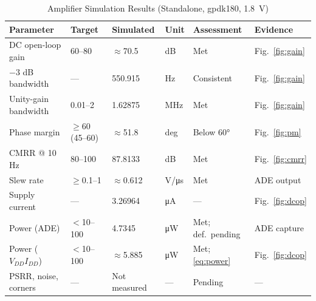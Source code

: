 \documentclass[conference]{IEEEtran}
\begin{document}
\begin{table}[!t]
\caption{Amplifier Simulation Results (Standalone, gpdk180, \SI{1.8}{\volt})}
\label{tab:res}
\centering\footnotesize
\begin{tabular}{@{}llllll@{}}
\toprule
Parameter & Target & Simulated & Unit & Assessment & Evidence \\
\midrule
DC open-loop gain & 60--80 & $\approx$70.5 & dB & Met & Fig.~\ref{fig:gain} \\
$-3$ dB bandwidth & --- & 550.915 & Hz & Consistent & Fig.~\ref{fig:gain} \\
Unity-gain bandwidth & 0.01--2 & 1.62875 & MHz & Met & Fig.~\ref{fig:gain} \\
Phase margin & $\ge$60 (45--60) & $\approx$51.8 & deg & Below \ang{60} & Fig.~\ref{fig:pm} \\
CMRR @ 10 Hz & 80--100 & 87.8133 & dB & Met & Fig.~\ref{fig:cmrr} \\
Slew rate & $\ge$0.1--1 & $\approx$0.612 & V/\si{\micro\second} & Met & ADE output \\
Supply current & --- & 3.26964 & \si{\micro\ampere} & --- & Fig.~\ref{fig:dcop} \\
Power (ADE) & $<$10--100 & 4.7345 & \si{\micro\watt} & Met; def.\ pending & ADE capture \\
Power ($V_{DD}I_{DD}$) & $<$10--100 & $\approx$5.885 & \si{\micro\watt} & Met; \eqref{eq:power} & Fig.~\ref{fig:dcop} \\
PSRR, noise, corners & --- & Not measured & --- & Pending & --- \\
\bottomrule
\end{tabular}
\end{table}
\end{document}
